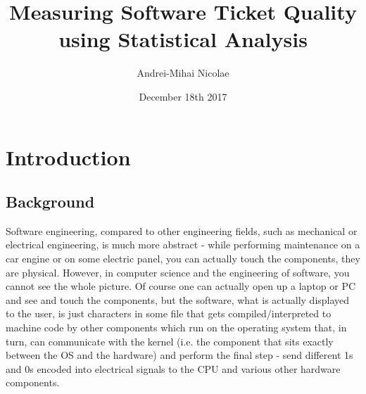 \documentclass{mprop}
\begin{document}
\title{Measuring Software Ticket Quality using Statistical Analysis}
\author{Andrei-Mihai Nicolae}
\date{December 18th 2017}
\maketitle

\tableofcontents
\newpage


\section{Introduction}\label{intro}

\subsection{Background}

Software engineering, compared to other engineering fields, such as
mechanical or electrical engineering, is much more abstract - while 
performing maintenance on a car engine or on some electric panel,
you can actually touch the components, they are physical. However, in
computer science and the engineering of software, you cannot see the whole picture.
Of course one can actually open up a laptop or PC and see and touch the
components, but the software, what is actually displayed to the user, 
is just characters in some file that gets compiled/interpreted to machine
code by other components which run on the operating system that, in turn,
can communicate with the kernel (i.e. the component that sits exactly
between the OS and the hardware) and perform the final step - send 
different 1s and 0s encoded into electrical signals to the CPU and various
other hardware components.
\end{document}
